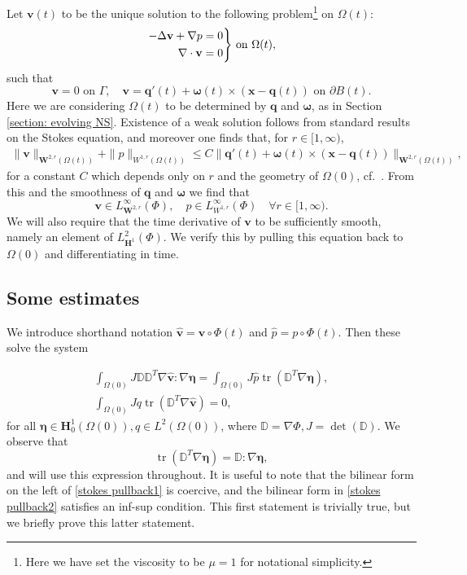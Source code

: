 \documentclass[a4paper]{amsart}
\numberwithin{equation}{section}
\newcommand{\grad}{\nabla}
\newcommand{\Div}{\nabla \cdot}
\newenvironment{rcases}
{\left.\begin{aligned}}
	{\end{aligned}\right\rbrace}
\theoremstyle{plain}
\newcommand{\mbf}[1]{\mathbf{#1}}
\newcommand{\mbb}[1]{\mathbb{#1}}
\newcommand{\tr}[1]{\operatorname{tr}\left(#1\right)}
\begin{document}
Let $\mbf{v}(t)$ to be the unique solution to the following problem\footnote{Here we have set the viscosity to be $\mu = 1$ for notational simplicity.} on $\Omega(t)$:
\begin{align}
    \begin{rcases}
        -\Delta \mbf{v} + \grad p &= 0\\
    \Div \mbf{v} &= 0
    \end{rcases} \text{ on } \Omega(t),
    \label{stokes problem}
\end{align}
such that
\[ \mbf{v} = 0 \text{ on } \Gamma, \quad \mbf{v}= \mbf{q}'(t) + \boldsymbol{\omega}(t)\times(\mbf{x} - \mbf{q}(t)) \text{ on } \partial B(t). \]
Here we are considering $\Omega(t)$ to be determined by $\mbf{q}$ and $\boldsymbol{\omega}$, as in Section \ref{section: evolving NS}.
Existence of a weak solution follows from standard results on the Stokes equation, and moreover one finds that, for $r \in [1, \infty)$,
\begin{align}
    \| \mbf{v} \|_{\mbf{W}^{2,r}(\Omega(t))} + \|{p}\|_{W^{1,r}(\Omega(t))}\leq C \| \mbf{q}'(t) + \boldsymbol{\omega}(t)\times(\mbf{x} - \mbf{q}(t)) \|_{\mbf{W}^{2,r}(\Omega(t))}, \label{stokes regularity1}
\end{align}
for a constant $C$ which depends only on $r$ and the geometry of $\Omega(0)$, cf.~\cite{galdi2011introduction,temam2001navier}.
From this and the smoothness of $\mbf{q}$ and $\boldsymbol{\omega}$ we find that
\[ \mbf{v} \in L^\infty_{\mbf{W}^{2,r}}(\Phi), \quad p \in L^\infty_{W^{1,r}}(\Phi) \quad \forall r \in [1,\infty). \]
We will also require that the time derivative of $\mbf{v}$ to be sufficiently smooth, namely an element of $L^2_{\mbf{H}^1}(\Phi)$.
We verify this by pulling this equation back to $\Omega(0)$ and differentiating in time.

\subsection{Some estimates}

We introduce shorthand notation $\widehat{\mbf{v}} = \mbf{v} \circ \Phi(t)$ and $\widehat{p} = p \circ \Phi(t)$.
Then these solve the system

\begin{gather}
    \int_{\Omega(0)} J \mbb{D} \mbb{D}^T \grad \widehat{\mbf{v}}:\grad\boldsymbol{\eta} = \int_{\Omega(0)} J \widehat{p} \tr{\mbb{D}^T \grad \boldsymbol{\eta}}, \label{stokes pullback1}\\
    \int_{\Omega(0)} J q \tr{\mbb{D}^T \grad \widehat{\mbf{v}}} = 0, \label{stokes pullback2}
\end{gather}
for all $\boldsymbol{\eta} \in \mbf{H}^1_0(\Omega(0)), q \in L^2(\Omega(0))$, where $\mbb{D} = \grad \Phi, J = \det(\mbb{D})$.
We observe that
\[ \tr{\mbb{D}^T \grad \boldsymbol{\eta}} = \mbb{D}: \grad \boldsymbol{\eta}, \]
and will use this expression throughout.
It is useful to note that the bilinear form on the left of \eqref{stokes pullback1} is coercive, and the bilinear form in \eqref{stokes pullback2} satisfies an inf-sup condition.
This first statement is trivially true, but we briefly prove this latter statement. 
\end{document}
